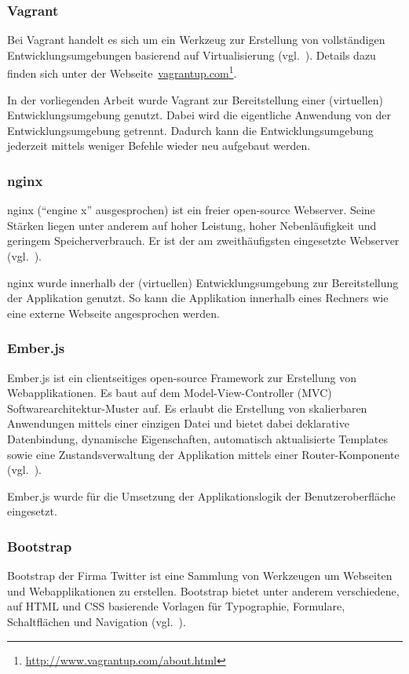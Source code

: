 \subsubsection{Vagrant}
\label{ssubsec:komponenten:gui:komponenten:vagrant}
Bei Vagrant handelt es sich um ein Werkzeug zur Erstellung von vollständigen Entwicklungsumgebungen basierend auf Virtualisierung (vgl.~\cite{vagrant}). Details dazu finden sich unter der Webseite~\href{http://www.vagrantup.com/about.html}{vagrantup.com}\footnote{\url{http://www.vagrantup.com/about.html}}.

In der vorliegenden Arbeit wurde Vagrant zur Bereitstellung einer (virtuellen) Entwicklungsumgebung genutzt. Dabei wird die eigentliche Anwendung von der Entwicklungsumgebung getrennt. Dadurch kann die Entwicklungsumgebung jederzeit mittels weniger Befehle wieder neu aufgebaut werden.

\subsubsection{nginx}
\label{ssubsec:komponenten:gui:komponenten:nginx}
nginx (``engine x'' ausgesprochen) ist ein freier open-source Webserver. Seine Stärken liegen unter anderem  auf hoher Leistung, hoher Nebenläufigkeit und geringem Speicherverbrauch. Er ist der am zweithäufigsten eingesetzte Webserver (vgl.~\cite{nginx}).

nginx wurde innerhalb der (virtuellen) Entwicklungsumgebung zur Bereitstellung der Applikation genutzt. So kann die Applikation innerhalb eines Rechners wie eine externe Webseite angesprochen werden.

\subsubsection{Ember.js}
\label{ssubsec:komponenten:gui:komponenten:emberjs}
Ember.js ist ein clientseitiges open-source Framework zur Erstellung von Webapplikationen. Es baut auf dem Model-View-Controller (MVC) Softwarearchitektur-Muster auf. Es erlaubt die Erstellung von skalierbaren Anwendungen mittels einer einzigen Datei und bietet dabei deklarative Datenbindung, dynamische Eigenschaften, automatisch aktualisierte Templates sowie eine Zustandsverwaltung der Applikation mittels einer Router-Komponente (vgl.~\cite{ember}).

Ember.js wurde für die Umsetzung der Applikationslogik der Benutzeroberfläche eingesetzt.

\subsubsection{Bootstrap}
\label{ssubsec:komponenten:gui:komponenten:bootstrap}
Bootstrap der Firma Twitter ist eine Sammlung von Werkzeugen um Webseiten und Webapplikationen zu erstellen. Bootstrap bietet unter anderem verschiedene, auf HTML und CSS basierende Vorlagen für Typographie, Formulare, Schaltflächen und Navigation (vgl.~\cite{bootstrap}).

